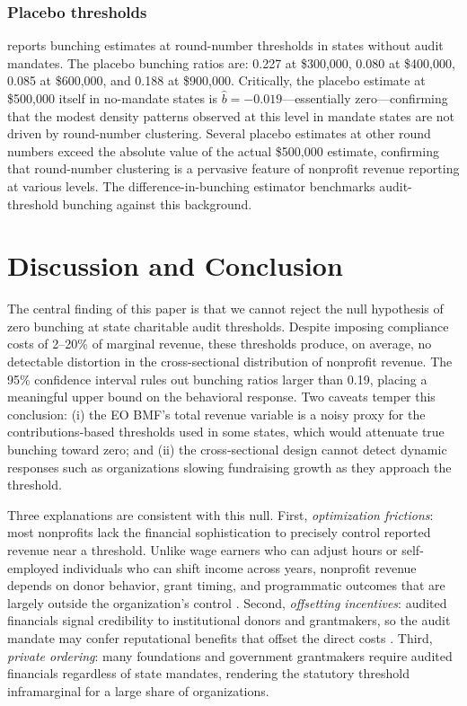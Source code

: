 \documentclass[12pt]{article}
\begin{document}
\subsubsection*{Placebo thresholds}  reports bunching estimates at round-number thresholds in states without audit mandates. The placebo bunching ratios are: 0.227 at \$300,000, 0.080 at \$400,000, 0.085 at \$600,000, and 0.188 at \$900,000. Critically, the placebo estimate at \$500,000 itself in no-mandate states is $\hat{b} = -0.019$---essentially zero---confirming that the modest density patterns observed at this level in mandate states are not driven by round-number clustering. Several placebo estimates at other round numbers exceed the absolute value of the actual \$500,000 estimate, confirming that round-number clustering is a pervasive feature of nonprofit revenue reporting at various levels. The difference-in-bunching estimator benchmarks audit-threshold bunching against this background.

\section{Discussion and Conclusion}

The central finding of this paper is that we cannot reject the null hypothesis of zero bunching at state charitable audit thresholds. Despite imposing compliance costs of 2--20\% of marginal revenue, these thresholds produce, on average, no detectable distortion in the cross-sectional distribution of nonprofit revenue. The 95\% confidence interval rules out bunching ratios larger than 0.19, placing a meaningful upper bound on the behavioral response. Two caveats temper this conclusion: (i) the EO BMF's total revenue variable is a noisy proxy for the contributions-based thresholds used in some states, which would attenuate true bunching toward zero; and (ii) the cross-sectional design cannot detect dynamic responses such as organizations slowing fundraising growth as they approach the threshold.

Three explanations are consistent with this null. First, \textit{optimization frictions}: most nonprofits lack the financial sophistication to precisely control reported revenue near a threshold. Unlike wage earners who can adjust hours or self-employed individuals who can shift income across years, nonprofit revenue depends on donor behavior, grant timing, and programmatic outcomes that are largely outside the organization's control \citep{Chetty2011}. Second, \textit{offsetting incentives}: audited financials signal credibility to institutional donors and grantmakers, so the audit mandate may confer reputational benefits that offset the direct costs \citep{Krishnan2006, Garven2018}. Third, \textit{private ordering}: many foundations and government grantmakers require audited financials regardless of state mandates, rendering the statutory threshold inframarginal for a large share of organizations.
\end{document}
